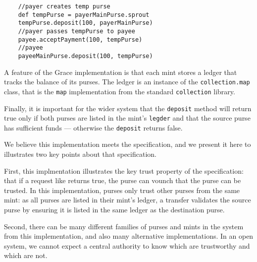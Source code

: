 \label{s-payment}
\begin{lstlisting}
    //payer creates temp purse
    def tempPurse = payerMainPurse.sprout
    tempPurse.deposit(100, payerMainPurse)
    //payer passes tempPurse to payee
    payee.acceptPayment(100, tempPurse)
    //payee
    payeeMainPurse.deposit(100, tempPurse)
\end{lstlisting}

A feature of the Grace implementation is that each mint stores a
ledger that tracks the balance of its purses.
The ledger is an instance of the \lstinline+collection.map+ class, that is
the \lstinline+map+ implementation from the standard
\lstinline+collection+ library.

Finally, it is important for the wider system that the
\lstinline+deposit+ method will return true only if both purses
are listed in the mint's \lstinline+legder+ and that the source purse
has sufficient funds --- otherwise the \lstinline+deposit+ returns false.

We believe this implementation meets the 
specification, and we present it here to illustrates two key points
about that specification. 

First, this implmentation illustrates the key trust property of the
 specification: that if a request like
 returns true, the  purse can
vounch that the  purse can be trusted. In this
implementation, purses only trust other purses from the same mint: as 
all purses are listed in their mint's ledger, a transfer validates the
source purse by ensuring it is listed in the same ledger as the
destination purse. 

Second, there can be many different families of purses and mints in
the system from this implementation, and also many alternative
implementations. In an open system, we cannot expect a central
authority to know which are trustworthy and which are not.





